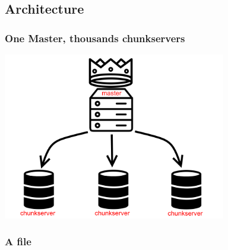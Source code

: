 \documentclass{beamer}
\newcommand{\slideheight}{7.3cm}
\begin{document}
\subsection{Architecture}
%
\begin{frame}
 \frametitle{One Master, thousands chunkservers}
 \centering
 \includegraphics[height=\slideheight]{figures/masterschema.png}
\end{frame}

%
\begin{frame}
 \frametitle{A file}
 
\end{frame}
\end{document}
